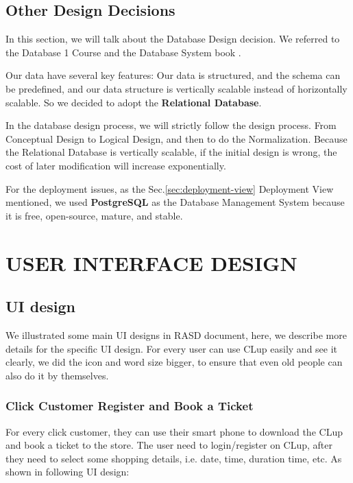\documentclass[a4paper,12pt]{report}
\begin{document}
\section{Other Design Decisions}

In this section, we will talk about the Database Design decision. We referred to the Database 1 Course \cite{Database1Course} and the Database System book \cite{DatabaseSystemBook}.

Our data have several key features: Our data is structured, and the schema can be predefined, and our data structure is vertically scalable instead of horizontally scalable.
So we decided to adopt the \textbf{Relational Database}.

In the database design process, we will strictly follow the design process.
From Conceptual Design to Logical Design, and then to do the Normalization.
Because the Relational Database is vertically scalable, if the initial design is wrong, the cost of later modification will increase exponentially.

For the deployment issues, as the Sec.\ref{sec:deployment-view} Deployment View mentioned, we used \textbf{PostgreSQL} as the Database Management System because it is free, open-source, mature, and stable.



\chapter{USER INTERFACE DESIGN}\label{ch:user-interface-design}

\section{UI design}
We illustrated some main UI designs in RASD document, here, we describe more details for the specific UI design. For every user can use CLup easily and see it clearly, we did the icon and word size bigger, to ensure that even old people can also do it by themselves. ~\\

\subsection{Click Customer Register and Book a Ticket}
For every click customer, they can use their smart phone to download the CLup and book a ticket to the store. The user need to login/register on CLup, after they need to select some shopping details, i.e. date, time, duration time, etc. As shown in following UI design:~\\
~\\ 
\end{document}

